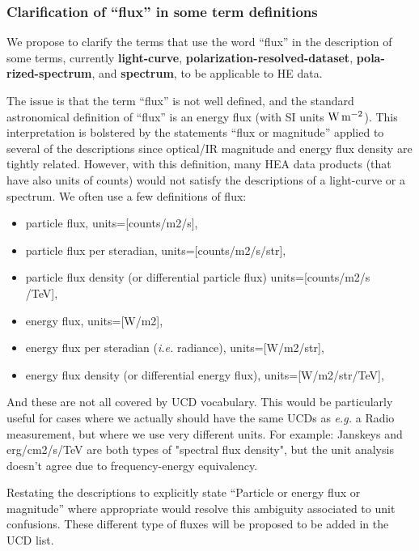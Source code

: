 \documentclass[11pt,a4paper]{ivoa}
\begin{document}


\subsubsection{Clarification of ``flux'' in some term definitions}

We propose to clarify the terms that use the word ``flux'' in the description of some terms, currently {\bf light-curve}, {\bf polarization-resolved-dataset}, {\bf pola-\\rized-spectrum}, and {\bf spectrum}, to be applicable to \gls{HE} data.

The issue is that the term ``flux'' is not well defined, and the standard astronomical definition of ``flux''
is an energy flux (with SI units $\rm W\,m^{-2}$).  This interpretation is bolstered by the statements ``flux or magnitude'' applied to several of the descriptions since optical/IR magnitude and energy flux density are tightly related.  However, with this definition, many \gls{HEA} data products (that have also units of counts) would not satisfy the descriptions of a light-curve or a spectrum. We often use a few definitions of flux:
\begin{itemize}
  \item particle flux, units=[counts/m2/s],
  \item particle flux per steradian, units=[counts/m2/s/str],
  \item particle flux density (or differential particle flux) units=[counts/m2/s\\/TeV],
  \item energy flux, units=[W/m2],
  \item energy flux per steradian ({\em i.e.\/} radiance), units=[W/m2/str],
  \item energy flux density (or differential energy flux), units=[W/m2/str/TeV],
\end{itemize}
And these are not all covered by UCD vocabulary. This would be particularly useful for cases where we actually should have the same UCDs as {\em e.g.\/} a Radio measurement, but where we use very different units. For example: Janskeys and erg/cm2/s/TeV are both types of "spectral flux density", but the unit analysis doesn't agree due to frequency-energy equivalency.

Restating the descriptions to explicitly state ``Particle or energy flux or magnitude'' where appropriate would resolve this ambiguity associated to unit confusions. These different type of fluxes will be proposed to be added in the UCD list.
\end{document}
